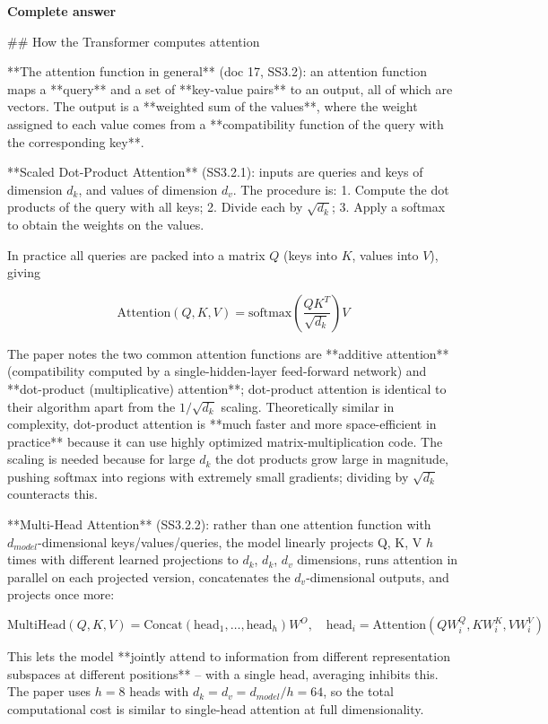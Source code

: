 \documentclass[10pt]{article}
\begin{document}
\textbf{Complete answer}
\begin{AnswerText}
## How the Transformer computes attention

**The attention function in general** (doc 17, SS3.2): an attention function maps a **query** and a set of **key-value pairs** to an output, all of which are vectors. The output is a **weighted sum of the values**, where the weight assigned to each value comes from a **compatibility function of the query with the corresponding key**.

**Scaled Dot-Product Attention** (SS3.2.1): inputs are queries and keys of dimension $d_k$, and values of dimension $d_v$. The procedure is:
1. Compute the dot products of the query with all keys;
2. Divide each by $\sqrt{d_k}$;
3. Apply a softmax to obtain the weights on the values.

In practice all queries are packed into a matrix $Q$ (keys into $K$, values into $V$), giving

$$\mathrm{Attention}(Q,K,V)=\mathrm{softmax}\!\left(\frac{QK^{T}}{\sqrt{d_k}}\right)V$$

The paper notes the two common attention functions are **additive attention** (compatibility computed by a single-hidden-layer feed-forward network) and **dot-product (multiplicative) attention**; dot-product attention is identical to their algorithm apart from the $1/\sqrt{d_k}$ scaling. Theoretically similar in complexity, dot-product attention is **much faster and more space-efficient in practice** because it can use highly optimized matrix-multiplication code. The scaling is needed because for large $d_k$ the dot products grow large in magnitude, pushing softmax into regions with extremely small gradients; dividing by $\sqrt{d_k}$ counteracts this.

**Multi-Head Attention** (SS3.2.2): rather than one attention function with $d_{model}$-dimensional keys/values/queries, the model linearly projects Q, K, V $h$ times with different learned projections to $d_k$, $d_k$, $d_v$ dimensions, runs attention in parallel on each projected version, concatenates the $d_v$-dimensional outputs, and projects once more:

$$\mathrm{MultiHead}(Q,K,V)=\mathrm{Concat}(\mathrm{head}_1,\dots,\mathrm{head}_h)W^O,\quad \mathrm{head}_i=\mathrm{Attention}(QW_i^Q,KW_i^K,VW_i^V)$$

This lets the model **jointly attend to information from different representation subspaces at different positions** -- with a single head, averaging inhibits this. The paper uses $h=8$ heads with $d_k=d_v=d_{model}/h=64$, so the total computational cost is similar to single-head attention at full dimensionality.


\end{AnswerText}
\end{document}
